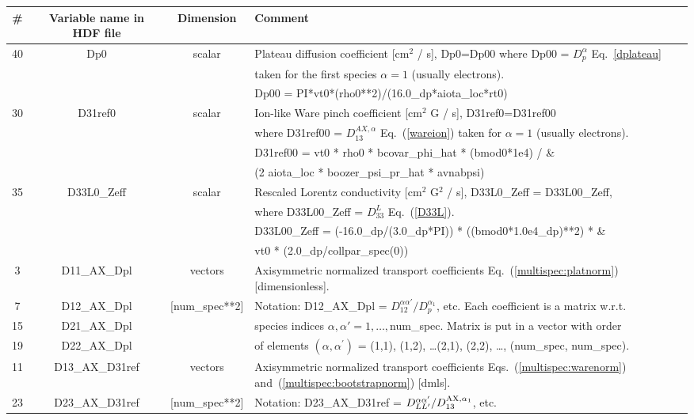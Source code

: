 \documentclass[preprint,prb,aps]{revtex4-1}
\newcommand{\red}[1]{{\color{red} #1}}
\newcommand{\eq}[1]{(\ref{#1})}
\begin{document}
\begin{table}[h]
\begin{tabular}{|c|c|c|l|}
\hline
\hline
\# & Variable name in HDF file & Dimension  & Comment \\
\hline
\hline
%
40 & Dp0 & scalar & Plateau diffusion coefficient [cm$^2$ / s], Dp0=Dp00 where Dp00 = $D_p^\alpha$ Eq.~\eqref{dplateau}\\
 & & & taken for the first species $\alpha=1$ (usually electrons). \\
 & & & Dp00 = PI*vt0*(rho0**2)/(16.0\_dp*aiota\_loc*rt0) \\
\hline
%
30 & D31ref0 & scalar &  Ion-like Ware pinch coefficient \red{[cm$^2$ G / s]}, D31ref0=D31ref00  \\
 & & & where D31ref00 = $D_{13}^{AX,\alpha}$ Eq.~\eq{wareion} taken for $\alpha=1$ (usually electrons). \\
 & & & D31ref00 = vt0 * rho0 * bcovar\_phi\_hat * (bmod0*1e4) / \& \\
 & & & (2 aiota\_loc * boozer\_psi\_pr\_hat * avnabpsi) \\
\hline
%
35 & D33L0\_Zeff & scalar & Rescaled Lorentz conductivity \red{[cm$^2$ G$^2$ / s]}, D33L0\_Zeff = D33L00\_Zeff, \\
 & & & where D33L00\_Zeff = $D_{33}^L$ Eq.~\eq{D33L}.\\
 & & & D33L00\_Zeff = (-16.0\_dp/(3.0\_dp*PI)) * ((bmod0*1.0e4\_dp)**2) * \& \\
 & & & vt0 * (2.0\_dp/collpar\_spec(0)) \\
\hline
\hline
%
3 & D11\_AX\_Dpl & vectors &
Axisymmetric normalized transport coefficients Eq.~\eq{multispec:platnorm} [dimensionless].
\\
7 & D12\_AX\_Dpl & [num\_spec**2] &
Notation: D12\_AX\_Dpl = $D_{12}^{\alpha \alpha'}/D_p^{\alpha_1}$, etc.
Each coefficient is a matrix w.r.t.
\\
15 & D21\_AX\_Dpl & &
species indices $\alpha, \alpha' = 1,\dots,$num\_spec. Matrix is put in a vector
with order
\\
19 & D22\_AX\_Dpl & &
of elements
\red{
$(\alpha,\alpha^\prime)$ = (1,1), (1,2), \dots (2,1), (2,2), \dots, (num\_spec, num\_spec).
}
\\
\hline
%
11 & D13\_AX\_D31ref & vectors &
Axisymmetric normalized transport coefficients Eqs.~\eq{multispec:warenorm}
and~\eq{multispec:bootstrapnorm} [dmls].
\\
23 & D23\_AX\_D31ref &  [num\_spec**2] &
Notation: D23\_AX\_D31ref = $D_{LL^\prime}^{\alpha \alpha'}/ D_{13}^{{\rm AX},\alpha_1}$, etc.

\end{tabular}
\end{table}
\end{document}
